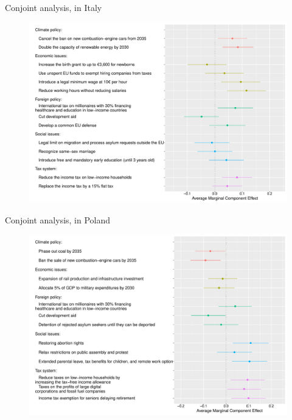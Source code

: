 \documentclass[aspectratio=169,xcolor=dvipsnames, 11pt,mathserif]{beamer}
\begin{document}
\begin{frame}{Conjoint analysis,  in Italy\label{conjoint_countries} \hyperlink{conjoint_country}{}} 
    \begin{figure} \vspace{-.14cm}
\includegraphics[height=.97\textheight]{../figures/all/conjoint_EN-IT.pdf}
\end{figure}
\end{frame}

\begin{frame}{Conjoint analysis,  in Poland\label{conjoint_countries} \hyperlink{conjoint_country}{}} 
    \begin{figure} \vspace{-.14cm}
\includegraphics[height=.97\textheight]{../figures/all/conjoint_EN-PL.pdf}
\end{figure}
\end{frame}
\end{document}
